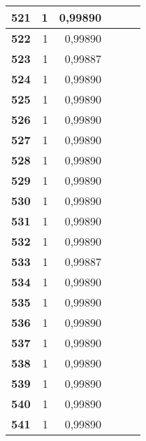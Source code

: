 \begin{longtable}{|r|r|r|l|r|r|}
\textbf{521} & 1 & 0,99890 &  & \multicolumn{1}{l|}{} & \multicolumn{1}{l|}{} \\ \hline
\textbf{522} & 1 & 0,99890 &  & \multicolumn{1}{l|}{} & \multicolumn{1}{l|}{} \\ \hline
\textbf{523} & 1 & 0,99887 &  & \multicolumn{1}{l|}{} & \multicolumn{1}{l|}{} \\ \hline
\textbf{524} & 1 & 0,99890 &  & \multicolumn{1}{l|}{} & \multicolumn{1}{l|}{} \\ \hline
\textbf{525} & 1 & 0,99890 &  & \multicolumn{1}{l|}{} & \multicolumn{1}{l|}{} \\ \hline
\textbf{526} & 1 & 0,99890 &  & \multicolumn{1}{l|}{} & \multicolumn{1}{l|}{} \\ \hline
\textbf{527} & 1 & 0,99890 &  & \multicolumn{1}{l|}{} & \multicolumn{1}{l|}{} \\ \hline
\textbf{528} & 1 & 0,99890 &  & \multicolumn{1}{l|}{} & \multicolumn{1}{l|}{} \\ \hline
\textbf{529} & 1 & 0,99890 &  & \multicolumn{1}{l|}{} & \multicolumn{1}{l|}{} \\ \hline
\textbf{530} & 1 & 0,99890 &  & \multicolumn{1}{l|}{} & \multicolumn{1}{l|}{} \\ \hline
\textbf{531} & 1 & 0,99890 &  & \multicolumn{1}{l|}{} & \multicolumn{1}{l|}{} \\ \hline
\textbf{532} & 1 & 0,99890 &  & \multicolumn{1}{l|}{} & \multicolumn{1}{l|}{} \\ \hline
\textbf{533} & 1 & 0,99887 &  & \multicolumn{1}{l|}{} & \multicolumn{1}{l|}{} \\ \hline
\textbf{534} & 1 & 0,99890 &  & \multicolumn{1}{l|}{} & \multicolumn{1}{l|}{} \\ \hline
\textbf{535} & 1 & 0,99890 &  & \multicolumn{1}{l|}{} & \multicolumn{1}{l|}{} \\ \hline
\textbf{536} & 1 & 0,99890 &  & \multicolumn{1}{l|}{} & \multicolumn{1}{l|}{} \\ \hline
\textbf{537} & 1 & 0,99890 &  & \multicolumn{1}{l|}{} & \multicolumn{1}{l|}{} \\ \hline
\textbf{538} & 1 & 0,99890 &  & \multicolumn{1}{l|}{} & \multicolumn{1}{l|}{} \\ \hline
\textbf{539} & 1 & 0,99890 &  & \multicolumn{1}{l|}{} & \multicolumn{1}{l|}{} \\ \hline
\textbf{540} & 1 & 0,99890 &  & \multicolumn{1}{l|}{} & \multicolumn{1}{l|}{} \\ \hline
\textbf{541} & 1 & 0,99890 &  & \multicolumn{1}{l|}{} & \multicolumn{1}{l|}{} \\ \hline

\end{longtable}
